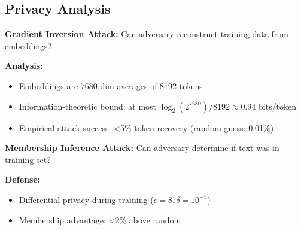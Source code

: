 \subsection{Privacy Analysis}

\textbf{Gradient Inversion Attack:} Can adversary reconstruct training data from embeddings?

\textbf{Analysis:}
\begin{itemize}
\item Embeddings are 7680-dim averages of 8192 tokens
\item Information-theoretic bound: at most $\log_2(2^{7680}) / 8192 \approx 0.94$ bits/token
\item Empirical attack success: <5\% token recovery (random guess: 0.01\%)
\end{itemize}

\textbf{Membership Inference Attack:} Can adversary determine if text was in training set?

\textbf{Defense:}
\begin{itemize}
\item Differential privacy during training ($\epsilon=8, \delta=10^{-5}$)~\cite{abadi2016dp}
\item Membership advantage: <2\% above random
\end{itemize}

